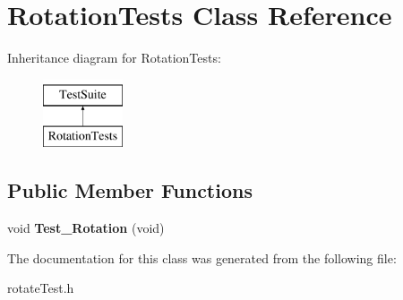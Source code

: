 \hypertarget{classRotationTests}{\section{Rotation\-Tests Class Reference}
\label{classRotationTests}
}
Inheritance diagram for Rotation\-Tests\-:\begin{figure}[H]
\begin{center}
\leavevmode
\includegraphics[height=2.000000cm]{classRotationTests}
\end{center}
\end{figure}
\subsection*{Public Member Functions}
\begin{DoxyCompactItemize}
\item 
\hypertarget{classRotationTests_a44576313475ee753beb239bfa8f3df2d}{void {\bfseries Test\-\_\-\-Rotation} (void)}\label{classRotationTests_a44576313475ee753beb239bfa8f3df2d}

\end{DoxyCompactItemize}


The documentation for this class was generated from the following file\-:\begin{DoxyCompactItemize}
\item 
rotate\-Test.\-h\end{DoxyCompactItemize}
